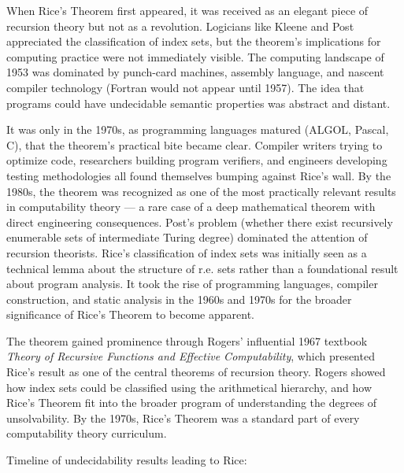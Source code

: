 When Rice's Theorem first appeared, it was received as an elegant piece of recursion theory but not as a revolution. Logicians like Kleene and Post appreciated the classification of index sets, but the theorem's implications for computing practice were not immediately visible. The computing landscape of 1953 was dominated by punch-card machines, assembly language, and nascent compiler technology (Fortran would not appear until 1957). The idea that programs could have undecidable semantic properties was abstract and distant.

It was only in the 1970s, as programming languages matured (ALGOL, Pascal, C), that the theorem's practical bite became clear. Compiler writers trying to optimize code, researchers building program verifiers, and engineers developing testing methodologies all found themselves bumping against Rice's wall. By the 1980s, the theorem was recognized as one of the most practically relevant results in computability theory --- a rare case of a deep mathematical theorem with direct engineering consequences. Post's problem (whether there exist recursively enumerable sets of intermediate Turing degree) dominated the attention of recursion theorists. Rice's classification of index sets was initially seen as a technical lemma about the structure of r.e. sets rather than a foundational result about program analysis. It took the rise of programming languages, compiler construction, and static analysis in the 1960s and 1970s for the broader significance of Rice's Theorem to become apparent.

The theorem gained prominence through Rogers' influential 1967 textbook \emph{Theory of Recursive Functions and Effective Computability}, which presented Rice's result as one of the central theorems of recursion theory. Rogers showed how index sets could be classified using the arithmetical hierarchy, and how Rice's Theorem fit into the broader program of understanding the degrees of unsolvability. By the 1970s, Rice's Theorem was a standard part of every computability theory curriculum.

Timeline of undecidability results leading to Rice:


